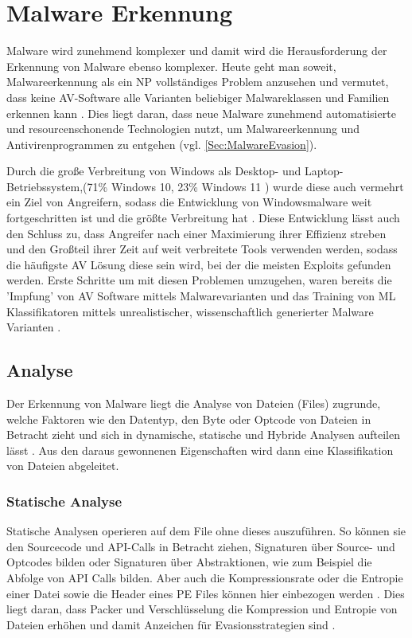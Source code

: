 \section{Malware Erkennung}
\label{Sec:Malwaredetektion}
Malware wird zunehmend komplexer \cite{pascalmaniriho_2023_a}  und damit wird die Herausforderung der Erkennung von Malware ebenso komplexer. Heute geht man soweit,  Malware\-erkennung als ein NP vollständiges Problem anzusehen \cite{ aslan_2020_a,pascalmaniriho_2023_a} und vermutet, dass keine AV-Software alle Varianten beliebiger Malwareklassen und Familien erkennen kann \cite{aboaoja_2022_malware}. Dies liegt daran, dass neue Malware zunehmend automatisierte und resourcenschonende Technologien nutzt, um Malwareerkennung und Antivirenprogrammen zu entgehen (vgl. \ref{Sec:MalwareEvasion}).

Durch die große Verbreitung  von Windows als Desktop- und Laptop-Betriebssystem,(71\% Windows 10, 23\% Windows 11 \cite{klotz_2023_windows}) wurde diese auch vermehrt ein Ziel von Angreifern, sodass die Entwicklung von Windows\-malware weit fortgeschritten ist und die größte Verbreitung hat \cite{aslan_2020_a}. Diese Entwicklung lässt auch den Schluss zu, dass Angreifer nach einer Maximierung ihrer Effizienz streben und den Großteil ihrer Zeit auf weit verbreitete Tools verwenden werden, sodass die häufigste AV Lösung diese sein wird, bei der die meisten Exploits gefunden werden. Erste Schritte um mit diesen Problemen umzugehen, waren bereits die 'Impfung' von AV Software mittels Malwarevarianten \cite{murali_2023_evolving} und das Training von ML Klassifikatoren mittels unrealistischer, wissenschaftlich generierter Malware Varianten \cite{dyrmishi_2023_on}.

\subsection{Analyse}
Der Erkennung von Malware liegt die Analyse von Dateien (Files) zugrunde, welche Faktoren wie den Datentyp, den Byte oder Optcode von Dateien in Betracht zieht und sich in dynamische, statische und Hybride Analysen aufteilen lässt \cite{aboaoja_2023_a}. Aus den daraus gewonnenen Eigenschaften wird dann eine Klassifikation von Dateien abgeleitet.
\subsubsection{Statische Analyse}
\label{analyse:statisch}
Statische Analysen operieren auf dem File ohne dieses auszuführen. So können sie den Sourcecode und API-Calls in Betracht ziehen, Signaturen über Source- und Optcodes bilden oder Signaturen über Abstraktionen, wie zum Beispiel die Abfolge von API Calls\cite{pascalmaniriho_2023_apimaldetect} bilden. Aber auch die Kompressionsrate oder die Entropie einer Datei sowie die Header eines PE Files können hier einbezogen werden \cite{aboaoja_2023_a, aslan_2020_a}. Dies liegt daran, dass Packer und Verschlüsselung die Kompression und Entropie von Dateien erhöhen und damit Anzeichen für Evasionsstrategien sind \cite{nunes_2022_bane}.

